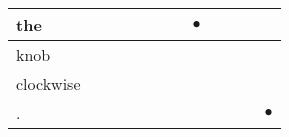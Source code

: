\documentclass[landscape]{article}
\newcommand{\ssp}{\hspace{2pt}}
\newcommand{\mex}{\cellcolor{g}$\bullet$}
\begin{document}
\begin{tabular}{|l|p{10pt}|p{10pt}|p{10pt}|p{10pt}|p{10pt}|p{10pt}|p{10pt}|p{10pt}|p{10pt}|p{10pt}|p{10pt}|}
\hline
\ssp \cellcolor{ref6}the \ssp&\hspace{2pt}&\hspace{2pt}&\hspace{2pt}&\hspace{2pt}&\hspace{2pt}&\hspace{2pt}&\hspace{2pt}\mex&\hspace{2pt}&\hspace{2pt}&\hspace{2pt}&\hspace{2pt}\\
\hline
\ssp knob \ssp&\hspace{2pt}&\hspace{2pt}&\hspace{2pt}&\hspace{2pt}&\hspace{2pt}&\hspace{2pt}&\hspace{2pt}&\hspace{2pt}&\hspace{2pt}&\hspace{2pt}&\hspace{2pt}\\
\hline
\ssp clockwise \ssp&\hspace{2pt}&\hspace{2pt}&\hspace{2pt}&\hspace{2pt}&\hspace{2pt}&\hspace{2pt}&\hspace{2pt}&\hspace{2pt}&\hspace{2pt}&\hspace{2pt}&\hspace{2pt}\\
\hline
\ssp \cellcolor{ref10}. \ssp&\hspace{2pt}&\hspace{2pt}&\hspace{2pt}&\hspace{2pt}&\hspace{2pt}&\hspace{2pt}&\hspace{2pt}&\hspace{2pt}&\hspace{2pt}&\hspace{2pt}&\hspace{2pt}\mex\\
\hline
\end{tabular}
\end{document}
